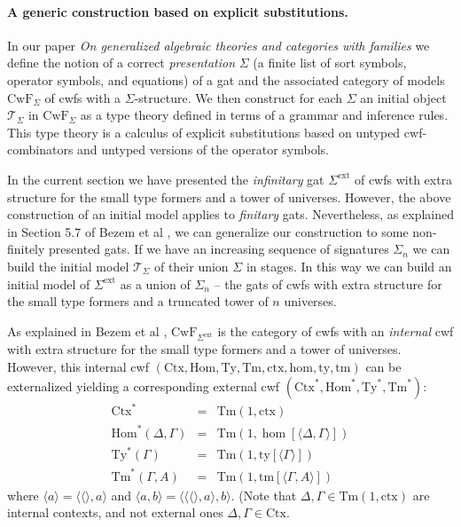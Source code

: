 \documentclass[11pt,a4paper]{article}
\theoremstyle{plain}
\theoremstyle{definition}
\newcommand{\Ctx}{\mathrm{Ctx}}
\newcommand{\Sub}{\mathrm{Hom}}
\newcommand{\Ty}{\mathrm{Ty}}
\newcommand{\Tm}{\mathrm{Tm}}
\newcommand{\T}{\mathsf{T}}
\def\sub{\mathrm{hom}}
\newcommand{\ctx}{\mathrm{ctx}}
\newcommand{\ty}{\mathrm{ty}}
\newcommand{\tm}{\mathrm{tm}}
\newcommand{\tuple}[1]{\langle #1 \rangle}
\def\T{\mathcal{T}}
\def\CwF{\mathrm{CwF}}
\def\Sigmaext{{\Sigma^\mathrm{ext}}}
\begin{document}
\paragraph{A generic construction based on explicit substitutions.} In our paper {\em On generalized algebraic theories and categories with families} \cite{bezem:hofmann} we define the notion of a correct {\em presentation} $\Sigma$ (a finite list of sort symbols, operator symbols, and equations) of a gat and the associated category of models $\CwF_\Sigma$ of cwfs with a $\Sigma$-structure. We then construct for each $\Sigma$ an initial object $\T_\Sigma$ in $\CwF_\Sigma$ as a type theory defined in terms of a grammar and inference rules. This type theory is a calculus of explicit substitutions based on untyped cwf-combinators and untyped versions of the operator symbols.

In the current section we have presented the {\em infinitary} gat $\Sigmaext$ of cwfs with extra structure for the small type formers and a tower of universes. However, the above construction of an initial model applies to {\em finitary} gats. Nevertheless, as explained in Section 5.7 of Bezem et al  \cite{bezem:hofmann}, we can generalize our construction to some non-finitely presented gats. If we have an increasing sequence of signatures $\Sigma_n$ we can build the initial model $\T_\Sigma$ of their union $\Sigma$ in stages. In this way we can build an initial model of $\Sigmaext$ as a union of $\Sigma_n$ -- the gats of cwfs with extra structure for the small type formers and a truncated tower of $n$ universes.

As explained in Bezem et al \cite{bezem:hofmann}, $\CwF_{\Sigmaext}$ is the category of cwfs with an {\em internal} cwf with extra structure for the small type formers and a tower of universes. However, this internal cwf $(\Ctx,\Sub,\Ty,\Tm,\ctx,\sub,\ty,\tm)$ can be externalized yielding a corresponding external cwf $(\Ctx^*,\Sub^*,\Ty^*,\Tm^*)$:
\begin{eqnarray*}
\Ctx^* &=& \Tm(1,\ctx)\\
\Sub^*(\Delta,\Gamma) &=& \Tm(1,\hom[\tuple{\Delta,\Gamma}])\\
\Ty^*(\Gamma) &=& \Tm(1,\ty[\tuple{\Gamma}])\\
\Tm^*(\Gamma,A) &=& \Tm(1,\tm[\tuple{\Gamma,A}])
\end{eqnarray*}
where $\tuple{a} = \tuple{\tuple{}, a}$ and $\tuple{a,b} = \tuple{\tuple{\tuple{}, a}, b}$. (Note that $\Delta,\Gamma \in \Tm(1,\ctx)$ are internal contexts, and not external ones $\Delta,\Gamma \in \Ctx$.
\end{document}

